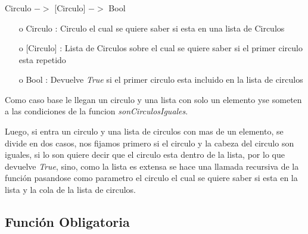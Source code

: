 \documentclass[10pt,journal]{IEEEtran}
\begin{document}
\subsubsection{\color{Red}{estaRepetidoPrimeroAux}}
\begin{description}[style=nextline]
        \item[\color{Green}{Signatura}] Circulo $->$ [Circulo] $->$ Bool 
        \begin{itemize} 
        \item [o]  Circulo : Circulo el cual se quiere saber si esta en una lista de Circulos
        \item [o] [Circulo] : Lista de Circulos sobre el cual se quiere saber si el primer circulo esta repetido 
        \item [o] Bool : Devuelve \textit{True} si el primer circulo esta incluido en la lista de circulos
        \end{itemize}        
        
        \item[\color{Green}{Descripción}] Como caso base le llegan un circulo y una lista con solo un elemento yse someten a las condiciones de la funcion \textit{sonCirculosIguales}.
        
        Luego, si entra un circulo y una lista de circulos con mas de un elemento, se divide en dos casos, nos fijamos primero si el circulo y la cabeza del circulo son iguales, si lo son quiere decir que el circulo esta dentro de la lista, por lo que devuelve \textit{True}, sino, como la lista es extensa se hace una llamada recursiva de la función pasandose como parametro el circulo el cual se quiere saber si esta en la lista y la cola de la lista de circulos.   
\end{description}

\subsection{Función Obligatoria}
\end{document}

